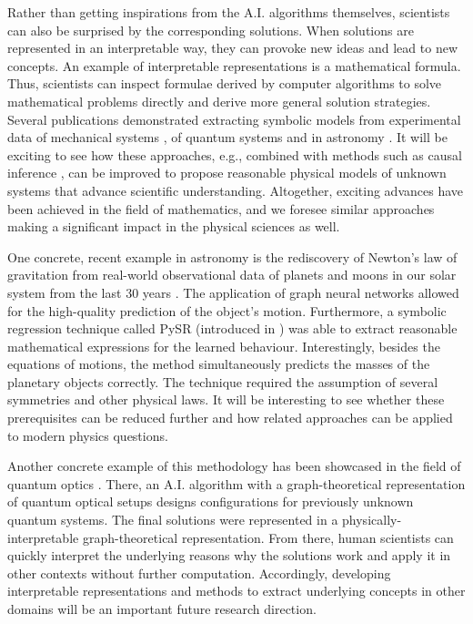  Rather than getting inspirations from the A.I. algorithms themselves, scientists can also be surprised by the corresponding solutions. When solutions are represented in an interpretable way, they can provoke new ideas and lead to new concepts. An example of interpretable representations is a mathematical formula. Thus, scientists can inspect formulae derived by computer algorithms to solve mathematical problems directly and derive more general solution strategies. Several publications demonstrated extracting symbolic models from experimental data of mechanical systems \cite{schmidt2009distilling, udrescu2020ai}, of quantum systems \cite{gentile2021learning} and in astronomy \cite{cranmer2020discovering}. It will be exciting to see how these approaches, e.g., combined with methods such as causal inference \cite{cranmer2020frontier}, can be improved to propose reasonable physical models of unknown systems that advance scientific understanding. Altogether, exciting advances have been achieved in the field of mathematics\cite{raayoni2021generating,wagner2021constructions}, and we foresee similar approaches making a significant impact in the physical sciences as well. 

One concrete, recent example in astronomy is the rediscovery of Newton's law of gravitation from real-world observational data of planets and moons in our solar system from the last 30 years \cite{lemos2022rediscovering}. The application of graph neural networks allowed for the high-quality prediction of the object's motion. Furthermore, a symbolic regression technique called PySR (introduced in \cite{cranmer2020discovering}) was able to extract reasonable mathematical expressions for the learned behaviour. Interestingly, besides the equations of motions, the method simultaneously predicts the masses of the planetary objects correctly. The technique required the assumption of several symmetries and other physical laws. It will be interesting to see whether these prerequisites can be reduced further and how related approaches can be applied to modern physics questions.

Another concrete example of this methodology has been showcased in the field of quantum optics \cite{krenn2020conceptual}. There, an A.I. algorithm with a graph-theoretical representation of quantum optical setups designs configurations for previously unknown quantum systems. The final solutions were represented in a physically-interpretable graph-theoretical representation. From there, human scientists can quickly interpret the underlying reasons why the solutions work and apply it in other contexts without further computation. Accordingly, developing interpretable representations and methods to extract underlying concepts in other domains will be an important future research direction.


